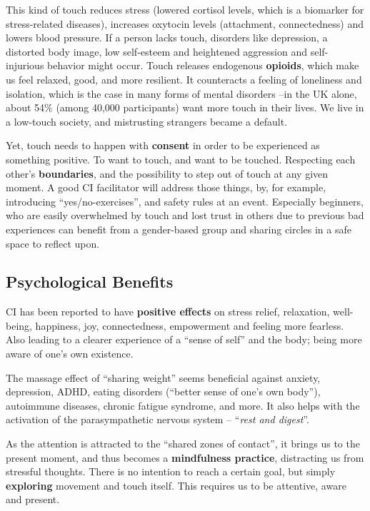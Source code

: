 This kind of touch reduces stress (lowered cortisol levels, which is a biomarker for stress-related diseases), increases oxytocin levels (attachment, connectedness) and lowers blood pressure.
If a person lacks touch, disorders like depression, a distorted body image, low self-esteem and heightened aggression and self-injurious behavior might occur.
Touch releases endogenous \textbf{opioids}, which make us feel relaxed, good, and more resilient.
It counteracts a feeling of loneliness and isolation, which is the case in many forms of mental disorders --in the UK alone, about 54\% (among 40,000 participants) want more touch in their lives.
We live in a low-touch society, and mistrusting strangers became a default.

Yet, touch needs to happen with \textbf{consent} in order to be experienced as something positive.
To want to touch, and want to be touched.
Respecting each other's \textbf{boundaries}, and the possibility to step out of touch at any given moment.
A good CI facilitator will address those things, by, for example, introducing ``yes/no-exercises'', and safety rules at an event.
Especially beginners, who are easily overwhelmed by touch and lost trust in others due to previous bad experiences can benefit from a gender-based group and sharing circles in a safe space to reflect upon.

\subsection{Psychological Benefits}\label{subsec:psychological-health-benefits}

CI has been reported to have \textbf{positive effects} on stress relief, relaxation, well-being, happiness, joy, connectedness, empowerment and feeling more fearless.
Also leading to a clearer experience of a ``sense of self'' and the body; being more aware of one's own existence.

The massage effect of ``sharing weight'' seems beneficial against anxiety, depression, ADHD, eating disorders (``better sense of one's own body''), autoimmune diseases, chronic fatigue syndrome, and more.
It also helps with the activation of the parasympathetic nervous system -- ``\textit{rest and digest}''.

As the attention is attracted to the ``shared zones of contact'', it brings us to the present moment, and thus becomes a \textbf{mindfulness practice}, distracting us from stressful thoughts.
There is no intention to reach a certain goal, but simply \textbf{exploring} movement and touch itself.
This requires us to be attentive, aware and present.

